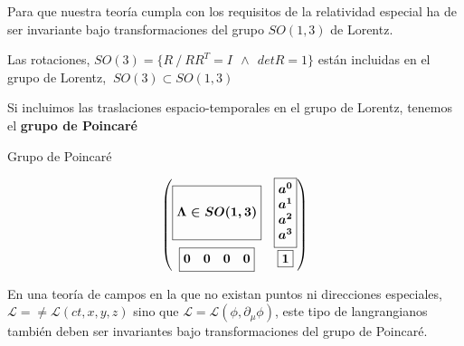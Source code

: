 Para que nuestra teoría cumpla con los requisitos de la relatividad especial ha de ser invariante bajo transformaciones del grupo $SO(1,3)$ de Lorentz.

Las rotaciones, $SO(3)=\{R \ / \ RR^T=I \ \ \wedge  \ \ det R=1 \}$ están incluidas en el grupo de Lorentz, $\ SO(3) \subset SO(1,3) \ $

Si incluimos las traslaciones espacio-temporales en el grupo de Lorentz, tenemos el \textbf{grupo de Poincaré}

\begin{myalertblock}{Grupo de Poincaré}

\begin{equation}
\label{T31GP}
\boldsymbol{
	\mqty( 
		\boxed{\mqty{\\\Lambda \in SO(1,3)\\ \\ } } & \boxed{\mqty{a^0\\a^1\\a^2\\a^3}} 
		\\ 
		\boxed{ \mqty{0&0&0&0} }& \boxed{1} 
	) 
}	
\end{equation}
	
\end{myalertblock}


\vspace{5mm} En una teoría de campos en la que no existan puntos ni  direcciones especiales, $\mathcal L=\neq \mathcal L(ct,x,y,z)$ sino que $\mathcal L = \mathcal L(\phi, \partial_\mu \phi)$, este tipo de langrangianos también deben ser invariantes bajo transformaciones del grupo de Poincaré.







